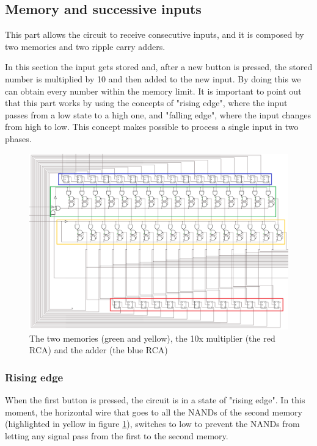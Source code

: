 \documentclass{article}
\begin{document}
\subsection{Memory and successive inputs}

This part allows the circuit to receive consecutive inputs, and it is composed by two memories and two ripple carry adders. 

\vspace{3mm}

In this section the input gets stored and, after a new button is pressed, the stored number is multiplied by 10 and then added to the new input. By doing this we can obtain every number within the memory limit.
\clearpage
It is important to point out that this part works by using the concepts of "rising edge", where the input passes from a low state to a high one, and "falling edge", where the input changes from high to low. This concept makes possible to process a single input in two phases.

\begin{figure}[h]
    \centering
    \includegraphics[scale=.55]{IM_Converter.PNG}
    \caption{The two memories (green and yellow), the 10x multiplier (the red RCA) and the adder (the blue RCA)}
    \label{Converter}
\end{figure}


\subsubsection{Rising edge}

When the first button is pressed, the circuit is in a state of "rising edge". In this moment, the horizontal wire that goes to all the NANDs of the second memory (highlighted in yellow in figure \ref{Converter}), switches to low to prevent the NANDs from letting any signal pass from the first to the second memory.
\end{document}
